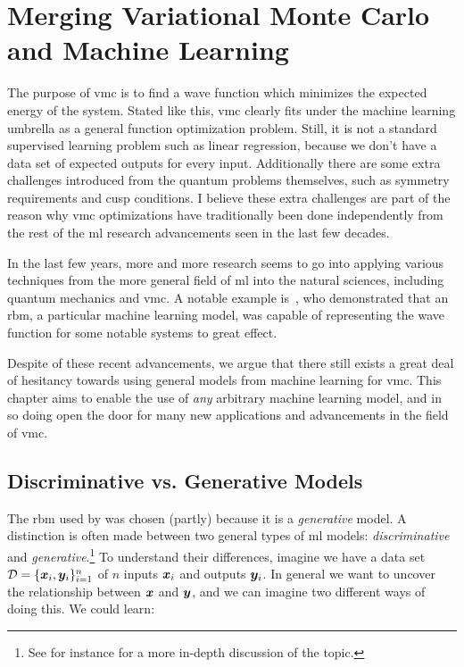 \documentclass[Thesis.tex]{subfiles}
\begin{document}
\chapter{Merging Variational Monte Carlo and Machine Learning}
\label{chp:mergin-vmc-with-ml}

\glsresetall

The purpose of \gls{vmc} is to find a wave function which minimizes the expected
energy of the system. Stated like this, \gls{vmc} clearly fits under the machine
learning umbrella as a general function optimization problem. Still, it is not a
standard supervised learning problem such as linear regression, because we don't
have a data set of expected outputs for every input. Additionally there are some
extra challenges introduced from the quantum problems themselves, such as
symmetry requirements and cusp conditions. I believe these extra challenges are
part of the reason why \gls{vmc} optimizations have traditionally been done
independently from the rest of the \gls{ml} research advancements seen in the
last few decades.

In the last few years, more and more research seems to go into applying various
techniques from the more general field of \gls{ml} into the natural sciences,
including quantum mechanics and \gls{vmc}. A notable example
is~\textcite{Carleo602}, who demonstrated that an \gls{rbm}, a particular
machine learning model, was capable of representing the wave function for some
notable systems to great effect.

Despite of these recent advancements, we argue that there still exists a
great deal of hesitancy towards using general models from machine learning for
\gls{vmc}. This chapter aims to enable the use of \emph{any} arbitrary machine
learning model, and in so doing open the door for many new applications and
advancements in the field of \gls{vmc}.


\section{Discriminative vs. Generative Models}


The \gls{rbm} used by \textcite{Carleo602} was chosen (partly) because it is a
\emph{generative} model. A distinction is often made between two general types
of \gls{ml} models: \emph{discriminative} and \emph{generative}.\footnote{See
for instance \textcite{Ng-2001} for a more in-depth discussion of the topic.} To
understand their differences, imagine we have a data set $\mathcal{D} = \{\bm{x}_i,
\bm{y}_i\}_{i=1}^n$ of $n$ inputs $\bm{x}_i$ and outputs $\bm{y}_i$. In general we want
to uncover the relationship between $\bm{x}$ and $\bm{y}$, and we can imagine two
different ways of doing this. We could learn:
\end{document}
